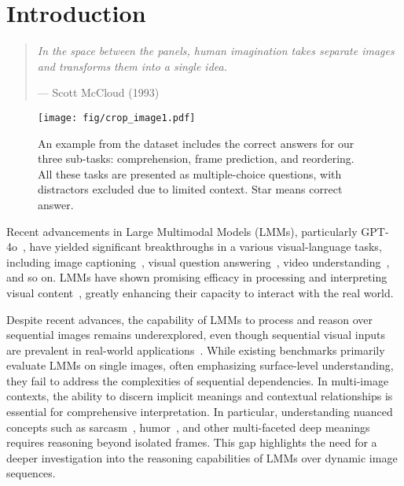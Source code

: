 \section{Introduction}

\begin{quote}
    \textit{In the space between the panels, human imagination takes separate images and transforms them into a single idea.}\par\raggedleft--- Scott McCloud (1993)
\end{quote}

\begin{figure}[t]
\centering
\texttt{[image: fig/crop\_image1.pdf]}
\caption{An example from the \dataset dataset includes the correct answers for our three sub-tasks: comprehension, frame prediction, and reordering. All these tasks are presented as multiple-choice questions, with distractors excluded due to limited context. Star means correct answer.}
\label{fig:intro}
\end{figure}

Recent advancements in Large Multimodal Models (LMMs), particularly GPT-4o~\citep{hurst2024gpt40}, have yielded significant breakthroughs in a various visual-language tasks, including image captioning~\cite{liu2023llava, Ghandi:2024imagecaption}, visual question answering~\cite{Lu:2023vqa, Zhu:2024minigpt-4}, video understanding~\cite{Zhang:2023video-llama, maaz:2024video-chatgpt}, and so on. LMMs have shown promising efficacy in processing and interpreting visual content~\cite{Yin:2024lmmsurvey}, greatly enhancing their capacity to interact with the real world.



Despite recent advances, the capability of LMMs to process and reason over sequential images remains underexplored, even though sequential visual inputs are prevalent in real-world applications~\cite{yang2024:deepsemantic, liu2024:iibench}. While existing benchmarks primarily evaluate LMMs on single images, often emphasizing surface-level understanding, they fail to address the complexities of sequential dependencies. In multi-image contexts, the ability to discern implicit meanings and contextual relationships is essential for comprehensive interpretation. In particular, understanding nuanced concepts such as sarcasm~\cite{cai-etal-2019-multi, tang:2024sarcasm}, humor~\cite{PatroL:2021humor, hessel2023:androids}, and other multi-faceted deep meanings~\cite{Zhang:2024CDeep} requires reasoning beyond isolated frames. This gap highlights the need for a deeper investigation into the reasoning capabilities of LMMs over dynamic image sequences.


